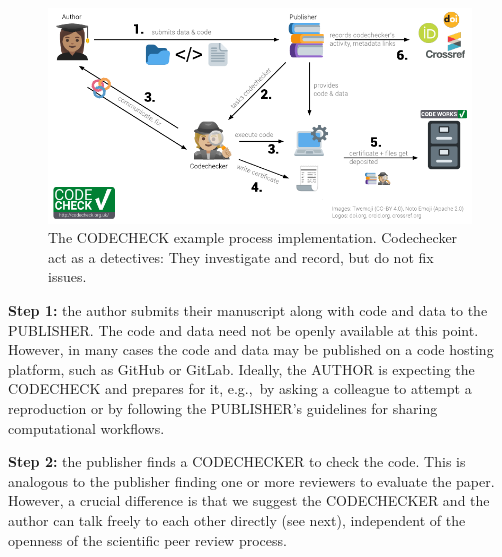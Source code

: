 \documentclass[12pt]{article}
\begin{document}
\begin{figure}
  \centering
      \includegraphics[width=\textwidth]{figs/codecheck_overview.pdf}
  \caption{The CODECHECK example process implementation. Codechecker act as a detectives:
  They investigate and record, but do not fix issues.}
  \label{fig:workflow}
\end{figure}

\textbf{Step 1:} the author submits their manuscript along with code and data to
the PUBLISHER. The code and data need not be openly available at this point.
However, in many cases the code and data may be published on a code hosting platform,
such as GitHub or GitLab. Ideally, the AUTHOR is expecting the CODECHECK and
prepares for it, e.g.,~by asking a colleague to attempt a reproduction or by 
following the PUBLISHER's guidelines for sharing computational workflows.

\textbf{Step 2:} the publisher finds a CODECHECKER to check the code. This is
analogous to the publisher finding one or more reviewers to evaluate
the paper. However, a crucial difference is that we suggest the CODECHECKER
and the author can talk freely to each other directly (see next), independent
of the openness of the scientific peer review process.
\end{document}
